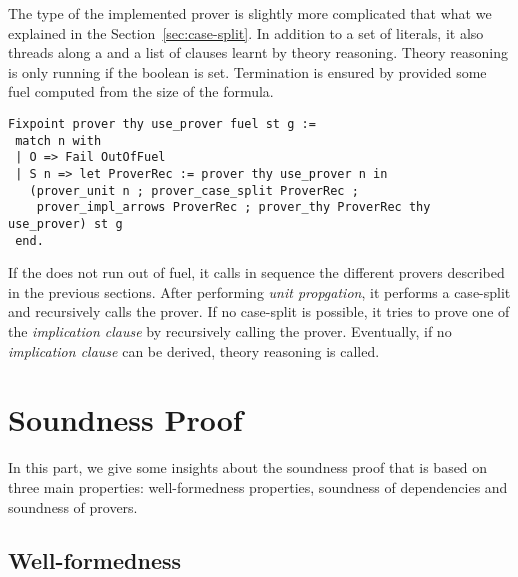 \documentclass[utf8,a4paper,UKenglish,cleveref, autoref, thm-restate]{lipics-v2019}
\begin{document}
The type of the implemented prover is slightly more complicated that what we explained in the Section~\ref{sec:case-split}.
In addition to a set of literals, it also threads along a  and a list of clauses learnt by theory reasoning.
Theory reasoning is only running if the boolean  is set.
%
Termination is ensured by provided some fuel computed from the size of the formula. 
\begin{verbatim}
Fixpoint prover thy use_prover fuel st g :=
 match n with
 | O => Fail OutOfFuel
 | S n => let ProverRec := prover thy use_prover n in
   (prover_unit n ; prover_case_split ProverRec ;
    prover_impl_arrows ProverRec ; prover_thy ProverRec thy use_prover) st g
 end.
\end{verbatim}
If the  does not run out of fuel, it calls in sequence
the different provers described in the previous sections.  After
performing \emph{unit propgation}, it performs a case-split and
recursively calls the prover. If no case-split is possible, it tries
to prove one of the \emph{implication clause} by recursively calling
the prover. Eventually, if no \emph{implication clause} can be
derived, theory reasoning is called.

\section{Soundness Proof}
\label{sec:soundness-proof}
In this part, we give some insights about the soundness proof that is
based on three main properties: well-formedness properties, soundness of
dependencies and soundness of provers.

\subsection{Well-formedness}
\end{document}
